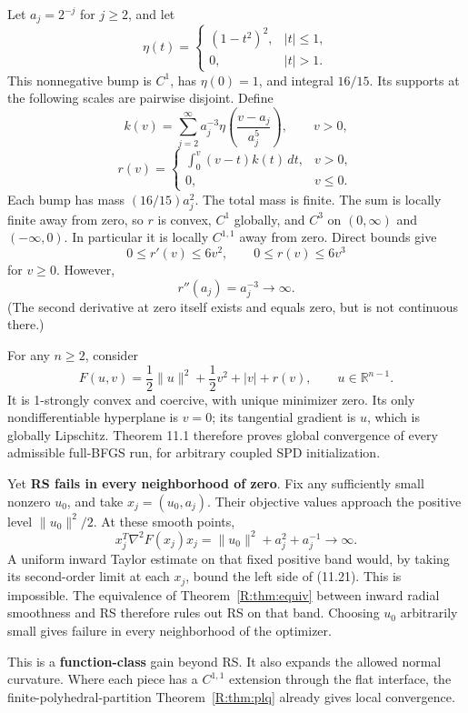 Let \(a_j=2^{-j}\) for \(j\ge2\), and let \[
 \eta(t)=\begin{cases}(1-t^2)^2,&|t|\le1,\\0,&|t|>1.\end{cases}
\] This nonnegative bump is \(C^1\), has \(\eta(0)=1\), and integral
\(16/15\). Its supports at the following scales are pairwise disjoint.
Define \[
 k(v)=\sum_{j=2}^{\infty}a_j^{-3}
 \eta\!\left(\frac{v-a_j}{a_j^5}\right),\qquad v>0,
\] \[
 r(v)=\begin{cases}
 \displaystyle\int_0^v(v-t)k(t)\,dt,&v>0,\\
 0,&v\le0.
 \end{cases}\tag{11.18}
\] Each bump has mass \((16/15)a_j^2\). The total mass is finite. The
sum is locally finite away from zero, so \(r\) is convex, \(C^1\)
globally, and \(C^3\) on \((0,\infty)\) and \((-\infty,0)\). In
particular it is locally \(C^{1,1}\) away from zero. Direct bounds give
\[
 0\le r'(v)\le6v^2,\qquad 0\le r(v)\le6v^3
\] for \(v\ge0\). However, \[
 r''(a_j)=a_j^{-3}\to\infty.\tag{11.19}
\] (The second derivative at zero itself exists and equals zero, but is
not continuous there.)

For any \(n\ge2\), consider \[
 \boxed{
 F(u,v)=\frac12\|u\|^2+\frac12v^2+|v|+r(v),
 \qquad u\in\mathbb R^{n-1}.
 }\tag{11.20}
\] It is 1-strongly convex and coercive, with unique minimizer zero. Its
only nondifferentiable hyperplane is \(v=0\); its tangential gradient is
\(u\), which is globally Lipschitz. Theorem 11.1 therefore proves global
convergence of every admissible full-BFGS run, for arbitrary coupled SPD
initialization.

Yet \textbf{RS fails in every neighborhood of zero}. Fix any
sufficiently small nonzero \(u_0\), and take \(x_j=(u_0,a_j)\). Their
objective values approach the positive level \(\|u_0\|^2/2\). At these
smooth points, \[
 x_j^T\nabla^2F(x_j)x_j
 =\|u_0\|^2+a_j^2+a_j^{-1}\longrightarrow\infty.\tag{11.21}
\] A uniform inward Taylor estimate on that fixed positive band would,
by taking its second-order limit at each \(x_j\), bound the left side of
(11.21). This is impossible. The equivalence of Theorem~\ref{R:thm:equiv} between inward radial
smoothness and RS therefore rules out RS on that band. Choosing \(u_0\)
arbitrarily small gives failure in every neighborhood of the optimizer.

This is a \textbf{function-class} gain beyond RS. It also expands
the allowed normal curvature. Where each piece has a \(C^{1,1}\)
extension through the flat interface, the
finite-polyhedral-partition Theorem~\ref{R:thm:plq} already gives local convergence.

